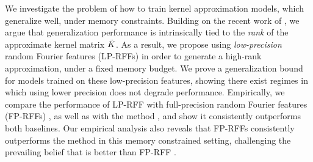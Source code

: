 




We investigate the problem of how to train kernel approximation models, which generalize well, under memory constraints.  Building on the recent work of \citeauthor{avron17}\citep{avron17}, we argue that generalization performance is intrinsically tied to the \emph{rank} of the approximate kernel matrix $\tilde{K}$. As a result, we propose using \emph{low-precision} random Fourier features (LP-RFFs) in order to generate a high-rank approximation, under a fixed memory budget.  We prove a generalization bound for models trained on these low-precision features, showing there exist regimes in which using lower precision does not degrade performance. Empirically, we compare the performance of LP-RFF with full-precision random Fourier features (FP-RFFs) \citep{rahimi07random}, as well as with the \Nystrom method \citep{nystrom}, and show it consistently outperforms both baselines. Our empirical analysis also reveals that FP-RFFs consistently outperforms the \Nystrom method in this memory constrained setting, challenging the prevailing belief that \Nystrom is better than FP-RFF \citep{nysvsrff12}.





